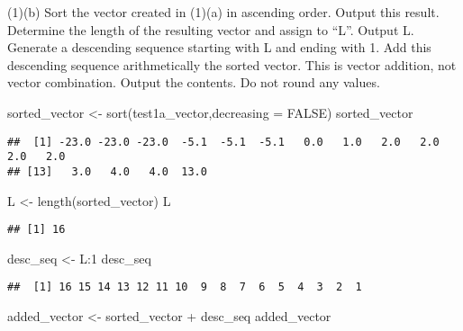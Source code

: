 \documentclass[
]{article}
\newenvironment{Shaded}{\begin{snugshade}}{\end{snugshade}}
\newcommand{\AttributeTok}[1]{\textcolor[rgb]{0.77,0.63,0.00}{#1}}
\newcommand{\ConstantTok}[1]{\textcolor[rgb]{0.00,0.00,0.00}{#1}}
\newcommand{\DecValTok}[1]{\textcolor[rgb]{0.00,0.00,0.81}{#1}}
\newcommand{\FunctionTok}[1]{\textcolor[rgb]{0.00,0.00,0.00}{#1}}
\newcommand{\NormalTok}[1]{#1}
\newcommand{\OtherTok}[1]{\textcolor[rgb]{0.56,0.35,0.01}{#1}}
\newcommand{\SpecialCharTok}[1]{\textcolor[rgb]{0.00,0.00,0.00}{#1}}
\begin{document}
(1)(b) Sort the vector created in (1)(a) in ascending order. Output this
result. Determine the length of the resulting vector and assign to
``L''. Output L. Generate a descending sequence starting with L and
ending with 1. Add this descending sequence arithmetically the sorted
vector. This is vector addition, not vector combination. Output the
contents. Do not round any values.

\begin{Shaded}
\begin{Highlighting}[]
\NormalTok{sorted\_vector }\OtherTok{\textless{}{-}} \FunctionTok{sort}\NormalTok{(test1a\_vector,}\AttributeTok{decreasing =} \ConstantTok{FALSE}\NormalTok{)}
\NormalTok{sorted\_vector}
\end{Highlighting}
\end{Shaded}

\begin{verbatim}
##  [1] -23.0 -23.0 -23.0  -5.1  -5.1  -5.1   0.0   1.0   2.0   2.0   2.0   2.0
## [13]   3.0   4.0   4.0  13.0
\end{verbatim}

\begin{Shaded}
\begin{Highlighting}[]
\NormalTok{L }\OtherTok{\textless{}{-}} \FunctionTok{length}\NormalTok{(sorted\_vector)}
\NormalTok{L}
\end{Highlighting}
\end{Shaded}

\begin{verbatim}
## [1] 16
\end{verbatim}

\begin{Shaded}
\begin{Highlighting}[]
\NormalTok{desc\_seq }\OtherTok{\textless{}{-}}\NormalTok{ L}\SpecialCharTok{:}\DecValTok{1}
\NormalTok{desc\_seq}
\end{Highlighting}
\end{Shaded}

\begin{verbatim}
##  [1] 16 15 14 13 12 11 10  9  8  7  6  5  4  3  2  1
\end{verbatim}

\begin{Shaded}
\begin{Highlighting}[]
\NormalTok{added\_vector }\OtherTok{\textless{}{-}}\NormalTok{ sorted\_vector }\SpecialCharTok{+}\NormalTok{ desc\_seq}
\NormalTok{added\_vector}
\end{Highlighting}
\end{Shaded}
\end{document}
